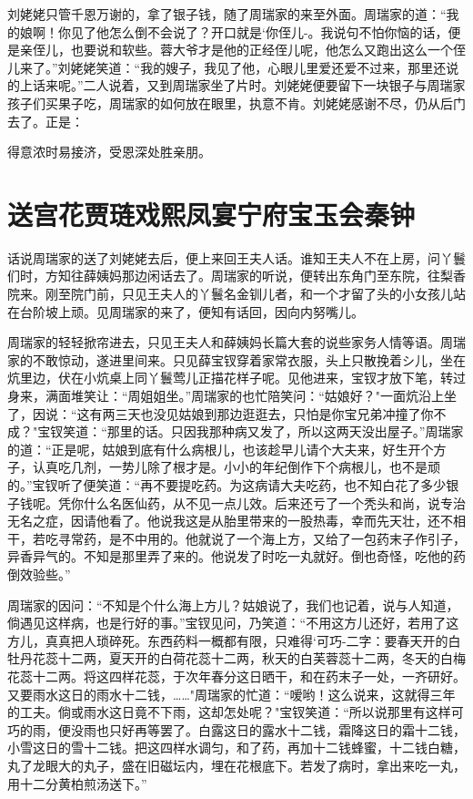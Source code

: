 刘姥姥只管千恩万谢的，拿了银子钱，随了周瑞家的来至外面。周瑞家的道：“我的娘啊！你见了他怎么倒不会说了？开口就是`你侄儿-。我说句不怕你恼的话，便是亲侄儿，也要说和软些。蓉大爷才是他的正经侄儿呢，他怎么又跑出这么一个侄儿来了。”刘姥姥笑道：“我的嫂子，我见了他，心眼儿里爱还爱不过来，那里还说的上话来呢。”二人说着，又到周瑞家坐了片时。刘姥姥便要留下一块银子与周瑞家孩子们买果子吃，周瑞家的如何放在眼里，执意不肯。刘姥姥感谢不尽，仍从后门去了。正是：

得意浓时易接济，受恩深处胜亲朋。

\chapter{送宫花贾琏戏熙凤\ttlbreak 宴宁府宝玉会秦钟}

话说周瑞家的送了刘姥姥去后，便上来回王夫人话。谁知王夫人不在上房，问丫鬟们时，方知往薛姨妈那边闲话去了。周瑞家的听说，便转出东角门至东院，往梨香院来。刚至院门前，只见王夫人的丫鬟名金钏儿者，和一个才留了头的小女孩儿站在台阶坡上顽。见周瑞家的来了，便知有话回，因向内努嘴儿。

周瑞家的轻轻掀帘进去，只见王夫人和薛姨妈长篇大套的说些家务人情等语。周瑞家的不敢惊动，遂进里间来。只见薛宝钗穿着家常衣服，头上只散挽着シ儿，坐在炕里边，伏在小炕桌上同丫鬟莺儿正描花样子呢。见他进来，宝钗才放下笔，转过身来，满面堆笑让：“周姐姐坐。”周瑞家的也忙陪笑问：“姑娘好？"一面炕沿上坐了，因说：“这有两三天也没见姑娘到那边逛逛去，只怕是你宝兄弟冲撞了你不成？"宝钗笑道：“那里的话。只因我那种病又发了，所以这两天没出屋子。”周瑞家的道：“正是呢，姑娘到底有什么病根儿，也该趁早儿请个大夫来，好生开个方子，认真吃几剂，一势儿除了根才是。小小的年纪倒作下个病根儿，也不是顽的。”宝钗听了便笑道：“再不要提吃药。为这病请大夫吃药，也不知白花了多少银子钱呢。凭你什么名医仙药，从不见一点儿效。后来还亏了一个秃头和尚，说专治无名之症，因请他看了。他说我这是从胎里带来的一股热毒，幸而先天壮，还不相干，若吃寻常药，是不中用的。他就说了一个海上方，又给了一包药末子作引子，异香异气的。不知是那里弄了来的。他说发了时吃一丸就好。倒也奇怪，吃他的药倒效验些。”

周瑞家的因问：“不知是个什么海上方儿？姑娘说了，我们也记着，说与人知道，倘遇见这样病，也是行好的事。”宝钗见问，乃笑道：“不用这方儿还好，若用了这方儿，真真把人琐碎死。东西药料一概都有限，只难得`可巧-二字：要春天开的白牡丹花蕊十二两，夏天开的白荷花蕊十二两，秋天的白芙蓉蕊十二两，冬天的白梅花蕊十二两。将这四样花蕊，于次年春分这日晒干，和在药末子一处，一齐研好。又要雨水这日的雨水十二钱，……"周瑞家的忙道：“嗳哟！这么说来，这就得三年的工夫。倘或雨水这日竟不下雨，这却怎处呢？"宝钗笑道：“所以说那里有这样可巧的雨，便没雨也只好再等罢了。白露这日的露水十二钱，霜降这日的霜十二钱，小雪这日的雪十二钱。把这四样水调匀，和了药，再加十二钱蜂蜜，十二钱白糖，丸了龙眼大的丸子，盛在旧磁坛内，埋在花根底下。若发了病时，拿出来吃一丸，用十二分黄柏煎汤送下。”

